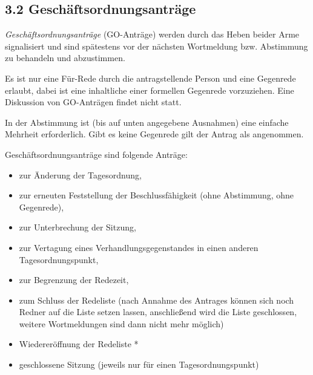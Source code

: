 \documentclass[12pt,oneside]{scrartcl}
\begin{document}
\subsection{3.2 Geschäftsordnungsanträge%
  \label{geschaftsordnungsantrage}%
}
\setcounter{listcnt0}{0}
\begin{list}{.}
{
\setlength{\rightmargin}{\leftmargin}
}

\item \emph{Geschäftsordnungsanträge} (GO-Anträge) werden durch das Heben
beider Arme signalisiert und sind spätestens vor der nächsten Wortmeldung
bzw. Abstimmung zu behandeln und abzustimmen.

\item Es ist nur eine Für-Rede durch die antragstellende Person und eine Gegenrede
erlaubt, dabei ist eine inhaltliche einer formellen Gegenrede vorzuziehen.
Eine Diskussion von GO-Anträgen findet nicht statt.

\item In der Abstimmung ist (bis auf unten angegebene Ausnahmen) eine einfache
Mehrheit erforderlich.
Gibt es keine Gegenrede gilt der Antrag als angenommen.

\item Geschäftsordnungsanträge sind folgende Anträge:
%
\begin{itemize}

\item zur Änderung der Tagesordnung,

\item zur erneuten Feststellung der Beschlussfähigkeit
(ohne Abstimmung, ohne Gegenrede),

\item zur Unterbrechung der Sitzung,

\item zur Vertagung eines Verhandlungsgegenstandes in einen anderen
Tagesordnungspunkt,

\item zur Begrenzung der Redezeit,

\item zum Schluss der Redeliste (nach Annahme des Antrages können sich
noch Redner auf die Liste setzen lassen, anschließend wird die Liste
geschlossen, weitere Wortmeldungen sind dann nicht mehr möglich)

\item Wiedereröffnung der Redeliste *

\item geschlossene Sitzung (jeweils nur für einen Tagesordnungspunkt)


\end{itemize}
\end{list}
\end{document}
